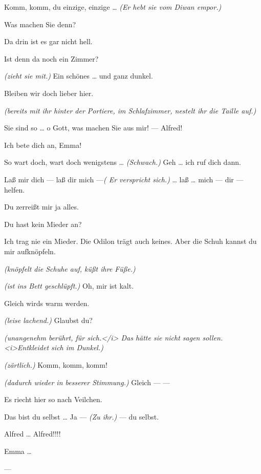 \documentclass[
	final,
	a4paper,
	ngerman,
	mpinclude = true, %
	twoside = true,
	open = right,
	cleardoublepage = plain,
	DIV = 13,
	BCOR = 1cm,
	titlepage = firstiscover,
	]{scrbook}
\newcommand{\direction}[1]{\textit{(#1)}}
\newcommand{\hiat}{---}
\newcommand{\thecharacter}[1]{\textup{\textsc{#1}}}
\newcommand{\theherr}{\thecharacter{Junger Herr}}
\newcommand{\thefrau}{\thecharacter{Junge Frau}}
\newcommand{\character}[1]{\item[#1:]}
\newcommand{\herr}{\character{\theherr}}
\newcommand{\frau}{\character{\thefrau}}
\begin{document}
\begin{play}
	\herr
	Komm, komm, du einzige, einzige \ldots{} \direction{Er hebt sie vom Diwan empor.}

	\frau
	Was machen Sie denn?

	\herr
	Da drin ist es gar nicht hell.

	\frau
	Ist denn da noch ein Zimmer?

	\herr
	\direction{zieht sie mit.} Ein schönes \ldots{} und ganz dunkel.

	\frau
	Bleiben wir doch lieber hier.

	\herr
	\direction{bereits mit ihr hinter der Portiere, im Schlafzimmer, nestelt ihr die Taille auf.}

	\frau
	Sie sind so \ldots{} o Gott, was machen Sie aus mir! --- Alfred!

	\herr
	Ich bete dich an, Emma!

	\frau
	So wart doch, wart doch wenigstens \ldots{} \direction{Schwach.} Geh \ldots{} ich ruf dich dann.

	\herr
	Laß mir dich --- laß dir mich ---\direction{ Er verspricht sich.} \ldots{} laß \ldots{} mich --- dir --- helfen.

	\frau
	Du zerreißt mir ja alles.

	\herr
	Du hast kein Mieder an?

	\frau
	Ich trag nie ein Mieder. Die Odilon trägt auch keines. Aber die Schuh kannst du mir aufknöpfeln.

	\herr
	\direction{knöpfelt die Schuhe auf, küßt ihre Füße.}

	\frau
	\direction{ist ins Bett geschlüpft.} Oh, mir ist kalt.

	\herr
	Gleich wirds warm werden.

	\frau
	\direction{leise lachend.} Glaubst du?

	\herr
	\direction{unangenehm berührt, für sich.</i> Das hätte sie nicht sagen sollen. <i>Entkleidet sich im Dunkel.}

	\frau
	\direction{zärtlich.} Komm, komm, komm!

	\herr
	\direction{dadurch wieder in besserer Stimmung.} Gleich --- ---

	\frau
	Es riecht hier so nach Veilchen.

	\herr
	Das bist du selbst \ldots{} Ja --- \direction{Zu ihr.} --- du selbst.

	\frau
	Alfred \ldots{} Alfred!!!!

	\herr
	Emma \ldots{}

	\hiat


\end{play}
\end{document}
